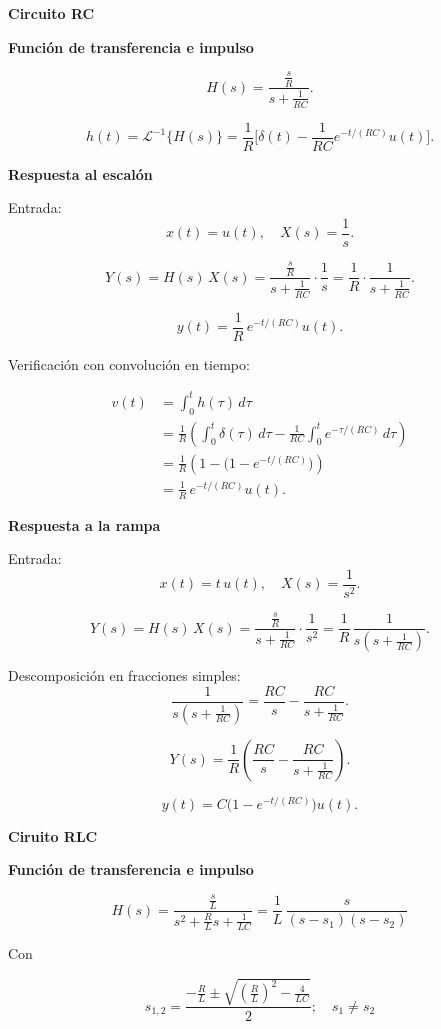 \textbf{Circuito RC}

\textbf{Función de transferencia e impulso}

\[
H(s) = \frac{\tfrac{s}{R}}{s+\tfrac{1}{RC}}.
\]

\[
h(t) = \mathscr{L}^{-1}\{H(s)\} 
= \frac{1}{R}\Big[\delta(t)-\frac{1}{RC}e^{-t/(RC)}u(t)\Big].
\]

\textbf{Respuesta al escalón}

Entrada:
\[
x(t)=u(t), \quad X(s)=\frac{1}{s}.
\]

\[
Y(s) = H(s)\,X(s) 
= \frac{\tfrac{s}{R}}{s+\tfrac{1}{RC}} \cdot \frac{1}{s}
= \frac{1}{R}\cdot \frac{1}{s+\tfrac{1}{RC}}.
\]

\[
y(t) = \frac{1}{R}\,e^{-t/(RC)}u(t).
\]

Verificación con convolución en tiempo:

\begin{align*}
v(t) &= \int_{0}^{t} h(\tau)\,d\tau \\
     &= \frac{1}{R}\left( \int_{0}^{t}\delta(\tau)\,d\tau 
     - \frac{1}{RC}\int_{0}^{t} e^{-\tau/(RC)}\,d\tau \right) \\
     &= \frac{1}{R}\left(1 - \big(1-e^{-t/(RC)}\big)\right) \\
     &= \frac{1}{R}\,e^{-t/(RC)}u(t).
\end{align*}

\textbf{Respuesta a la rampa}

Entrada:
\[
x(t)=t\,u(t), \quad X(s)=\frac{1}{s^2}.
\]

\[
Y(s) = H(s)\,X(s) 
= \frac{\tfrac{s}{R}}{s+\tfrac{1}{RC}} \cdot \frac{1}{s^2}
= \frac{1}{R}\,\frac{1}{s(s+\tfrac{1}{RC})}.
\]

Descomposición en fracciones simples:
\[
\frac{1}{s(s+\tfrac{1}{RC})} = \frac{RC}{s} - \frac{RC}{s+\tfrac{1}{RC}}.
\]

\[
Y(s)=\frac{1}{R}\left(\frac{RC}{s}-\frac{RC}{s+\tfrac{1}{RC}}\right).
\]

\[
y(t) = C\big(1-e^{-t/(RC)}\big)u(t).
\]

\textbf{Ciruito RLC}

\textbf{Función de transferencia e impulso}

\[
H(s) = \frac{\tfrac{s}{L}}{s^2+\tfrac{R}{L}s+\tfrac{1}{LC}}
= \frac{1}{L}\,\frac{s}{(s-s_1)(s-s_2)}
\]

Con

\[
s_{1,2} = \frac{-\tfrac{R}{L}\pm \sqrt{\left(\tfrac{R}{L}\right)^2-\tfrac{4}{LC}}}{2} ; 
\quad s_1 \neq s_2
\]

